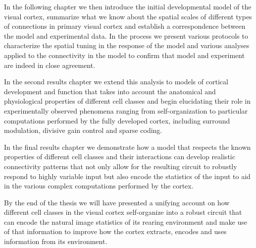 In the following chapter we then introduce the initial developmental
model of the visual cortex, summarize what we know about the spatial
scales of different types of connections in primary visual cortex and
establish a correspondence between the model and experimental data. In
the process we present various protocols to characterize the spatial
tuning in the response of the model and various analyses applied to
the connectivity in the model to confirm that model and experiment are
indeed in close agreement.

In the second results chapter we extend this analysis to models of
cortical development and function that takes into account the
anatomical and physiological properties of different cell classes and
begin elucidating their role in experimentally observed phenomena
ranging from self-organization to particular computations performed by
the fully developed cortex, including surround modulation, divisive
gain control and sparse coding.

In the final results chapter we demonstrate how a model that respects
the known properties of different cell classes and their interactions
can develop realistic connectivity patterns that not only allow for
the resulting circuit to robustly respond to highly variable input but
also encode the statistics of the input to aid in the various complex
computations performed by the cortex.

By the end of the thesis we will have presented a unifying account on
how different cell classes in the visual cortex self-organize into a
robust circuit that can encode the natural image statistics of its
rearing environment and make use of that information to improve how
the cortex extracts, encodes and uses information from its
environment.
